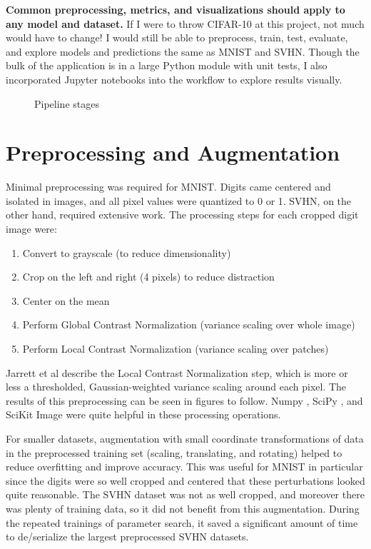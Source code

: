 \documentclass{article}
\begin{document}
\textbf{Common preprocessing, metrics, and visualizations should apply to any model and dataset.} If I were to throw CIFAR-10 \cite{krizhevsky2009learning} at this project, not much would have to change! I would still be able to preprocess, train, test, evaluate, and explore models and predictions the same as MNIST and SVHN. Though the bulk of the application is in a large Python module with unit tests, I also incorporated Jupyter \cite{PER-GRA:2007} notebooks into the workflow to explore results visually.

\begin{figure}[htbp]
  \centering
  
  \caption{Pipeline stages}
  \label{fig:pipeline}
\end{figure}

\section{Preprocessing and Augmentation}

Minimal preprocessing was required for MNIST. Digits came centered and isolated in images, and all pixel values were quantized to 0 or 1. SVHN, on the other hand, required extensive work. The processing steps for each cropped digit image were:

\begin{enumerate}
  \item Convert to grayscale (to reduce dimensionality)
  \item Crop on the left and right (4 pixels) to reduce distraction
  \item Center on the mean
  \item Perform Global Contrast Normalization (variance scaling over whole image)
  \item Perform Local Contrast Normalization (variance scaling over patches)
\end{enumerate}

Jarrett et al \cite{jarrett2009best} describe the Local Contrast Normalization step, which is more or less a thresholded, Gaussian-weighted variance scaling around each pixel. The results of this preprocessing can be seen in figures to follow. Numpy \cite{van2011numpy}, SciPy \cite{scipy}, and SciKit Image \cite{van2014scikit} were quite helpful in these processing operations.

For smaller datasets, augmentation with small coordinate transformations of data in the preprocessed training set (scaling, translating, and rotating) helped to reduce overfitting and improve accuracy. This was useful for MNIST in particular since the digits were so well cropped and centered that these perturbations looked quite reasonable. The SVHN dataset was not as well cropped, and moreover there was plenty of training data, so it did not benefit from this augmentation. During the repeated trainings of parameter search, it saved a significant amount of time to de/serialize the largest preprocessed SVHN datasets.
\end{document}
